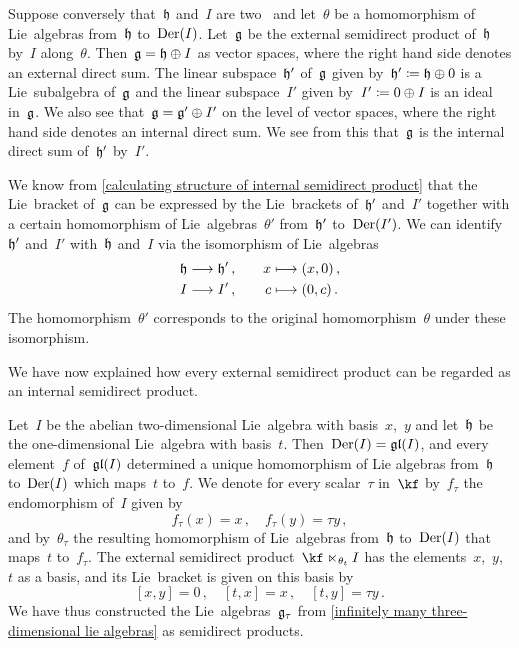 \begin{fluff}
  Suppose conversely that~$\mathfrak{h}$ and~$I$ are two~\liealgebras{$\kf$} and let~$\theta$ be a homomorphism of Lie~algebras from~$\mathfrak{h}$ to~$\operatorname{Der}(I)$.
  Let~$\mathfrak{g}$ be the external semidirect product of~$\mathfrak{h}$ by~$I$ along~$\theta$.
  Then~$\mathfrak{g} = \mathfrak{h} \oplus I$ as vector spaces, where the right hand side denotes an external direct sum.
  The linear subspace~$\mathfrak{h}'$ of~$\mathfrak{g}$ given by~$\mathfrak{h}' \coloneqq \mathfrak{h} \oplus 0$ is a Lie~subalgebra of~$\mathfrak{g}$ and the linear subspace~$I'$ given by~$I' \coloneqq 0 \oplus I$ is an ideal in~$\mathfrak{g}$.
  We also see that~$\mathfrak{g} = \mathfrak{g}' \oplus I'$ on the level of vector spaces, where the right hand side denotes an internal direct sum.
  We see from this that~$\mathfrak{g}$ is the internal direct sum of~$\mathfrak{h}'$ by~$I'$.

  We know from \cref{calculating structure of internal semidirect product} that the Lie~bracket of~$\mathfrak{g}$ can be expressed by the Lie~brackets of~$\mathfrak{h}'$ and~$I'$ together with a certain homomorphism of Lie~algebras~$\theta'$ from~$\mathfrak{h}'$ to~$\operatorname{Der}(I')$.
  We can identify~$\mathfrak{h}'$ and~$I'$ with~$\mathfrak{h}$ and~$I$ via the isomorphism of Lie~algebras
  \begin{alignat*}{2}
    \hlie
    &\to
    \hlie' \,,
    &\quad
    x
    &\mapsto
    (x, 0) \,,
    \\
    I
    &\to
    I' \,,
    &\quad
    c
    &\mapsto
    (0, c) \,.
  \end{alignat*}
  The homomorphism~$\theta'$ corresponds to the original homomorphism~$\theta$ under these isomorphism.

  We have now explained how every external semidirect product can be regarded as an internal semidirect product.
\end{fluff}


\begin{example}
  Let~$I$ be the abelian two-dimensional Lie~algebra with basis~$x$,~$y$ and let~$\mathfrak{h}$ be the one-dimensional Lie~algebra with basis~$t$.
  Then~$\operatorname{Der}(I) = \mathfrak{gl}(I)$, and every element~$f$ of~$\mathfrak{gl}(I)$ determined a unique homomorphism of Lie algebras from~$\mathfrak{h}$ to~$\operatorname{Der}(I)$ which maps~$t$ to~$f$.
  We denote for every scalar~$\tau$ in~$\kf$ by~$f_\tau$ the endomorphism of~$I$ given by
  \[
    f_\tau(x) = x \,,
    \quad
    f_\tau(y) = \tau y \,,
  \]
  and by~$\theta_\tau$ the resulting homomorphism of Lie~algebras from~$\mathfrak{h}$ to~$\operatorname{Der}(I)$ that maps~$t$ to~$f_\tau$.
  The external semidirect product~${\kf} \ltimes_{\theta_t} I$ has the elements~$x$,~$y$,~$t$ as a basis, and its Lie~bracket is given on this basis by
  \[
    [x,y] = 0 \,,
    \quad
    [t,x] = x \,,
    \quad
    [t,y] =  \tau y \,.
  \]
  We have thus constructed the Lie~algebras~$\mathfrak{g}_\tau$ from \cref{infinitely many three-dimensional lie algebras} as semidirect products.
\end{example}

